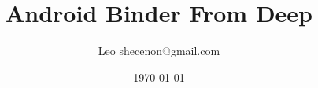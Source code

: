 \documentclass[a4paper,11pt]{article}
\title{Android Binder From Deep}
\author{Leo shecenon@gmail.com}
\date{\today}
\begin{document}
\maketitle
\renewcommand{\refname}{参考文献}
\renewcommand\contentsname{目录}
\renewcommand\listfigurename{插图目录}
\renewcommand\listtablename{表格目录}
\renewcommand\indexname{索引}
\renewcommand\appendixname{附录}
\renewcommand\figurename{图}
\renewcommand\tablename{表}
\renewcommand{\lstlistlistingname}{代码列表集}
\renewcommand{\lstlistingname}{代码}

\def\equationautorefname{公式}%
\def\figureautorefname{图}%
\def\subfigureautorefname{子图}%
\def\sectionautorefname{节}%
\def\subsectionautorefname{子节}%
\def\subsubsectionautorefname{小节}%
\def\Itemautorefname{项}%
\def\tableautorefname{表格}%
\def\footnoteautorefname{脚注} 
\def\appendixautorefname{附录}


\setlength{\columnsep}{.8cm}
\setlength{\parskip}{1ex}
\tableofcontents
\makeatletter
\newcommand{\figcaption}{\def\@captype{figure}\caption}
\newcommand{\tabcaption}{\def\@captype{table}\caption}
\makeatother

\def\call#1{\\* {\indent #1 \\*\noindent}} 
\newcommand{\various}[1]{{\color{cyan}\textit{#1}}}
\def\binder{{\color{red}binder }}

\def\lbd{本地Binder}
\def\rbd{远程Binder}
\def\binderobj{\lbd}%
\def\binderref{\rbd}%
\def\service{}%
\def\client{}%
\def\impl{}%
\def\proxy{}%


\setlength{\leftmargin}{1.2em}     %
\setlength{\parsep}{0ex}         %
\setlength{\topsep}{1ex}         %
\setlength{\itemsep}{0.5ex}        %
\setlength{\labelsep}{0.3em}     %
\setlength{\itemindent}{1.1em}    %
\setlength{\listparindent}{0em} %
\end{document}
